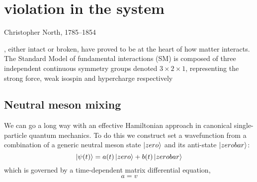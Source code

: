 \chapter{violation in the system}
\label{chap:SomeStuff}


%
{Christopher North, 1785--1854}%

, either intact or broken, have proved to be at the heart
of how matter interacts. The Standard Model of fundamental interactions
(SM) is composed of three independent continuous symmetry groups denoted 
${3} \times {2} \times {1}$, representing the 
strong force, weak isospin and hypercharge 
respectively

\section{Neutral meson mixing}
We can go a long way with an effective Hamiltonian approach in
canonical single-particle quantum mechanics. To do this we construct
\gls{set}
a wavefunction from a combination of a generic neutral meson state 
$\mathinner{|{zero}\rangle}$ and its anti-state $\mathinner{|{zerobar}\rangle}$:
%
\begin{equation}
  \ket{\psi(t)} = a(t)\ket{zero} + b(t)\ket{zerobar}
\end{equation}
%
which is governed by a time-dependent matrix differential equation,
%
\begin{equation}
  a=v
\end{equation}
